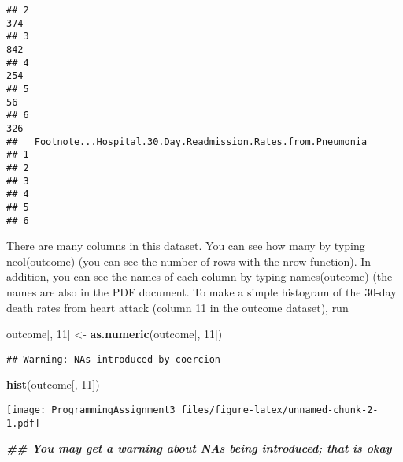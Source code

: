 \documentclass[
]{article}
\newenvironment{Shaded}{\begin{snugshade}}{\end{snugshade}}
\newcommand{\DecValTok}[1]{\textcolor[rgb]{0.00,0.00,0.81}{#1}}
\newcommand{\DocumentationTok}[1]{\textcolor[rgb]{0.56,0.35,0.01}{\textbf{\textit{#1}}}}
\newcommand{\FunctionTok}[1]{\textcolor[rgb]{0.13,0.29,0.53}{\textbf{#1}}}
\newcommand{\NormalTok}[1]{#1}
\newcommand{\OtherTok}[1]{\textcolor[rgb]{0.56,0.35,0.01}{#1}}
\begin{document}
\begin{verbatim}
## 2                                                                   374
## 3                                                                   842
## 4                                                                   254
## 5                                                                    56
## 6                                                                   326
##   Footnote...Hospital.30.Day.Readmission.Rates.from.Pneumonia
## 1                                                            
## 2                                                            
## 3                                                            
## 4                                                            
## 5                                                            
## 6
\end{verbatim}

There are many columns in this dataset. You can see how many by typing
ncol(outcome) (you can see the number of rows with the nrow function).
In addition, you can see the names of each column by typing
names(outcome) (the names are also in the PDF document. To make a simple
histogram of the 30-day death rates from heart attack (column 11 in the
outcome dataset), run

\begin{Shaded}
\begin{Highlighting}[]
\NormalTok{outcome[, }\DecValTok{11}\NormalTok{] }\OtherTok{\textless{}{-}} \FunctionTok{as.numeric}\NormalTok{(outcome[, }\DecValTok{11}\NormalTok{])}
\end{Highlighting}
\end{Shaded}

\begin{verbatim}
## Warning: NAs introduced by coercion
\end{verbatim}

\begin{Shaded}
\begin{Highlighting}[]
\FunctionTok{hist}\NormalTok{(outcome[, }\DecValTok{11}\NormalTok{])}
\end{Highlighting}
\end{Shaded}

\texttt{[image: ProgrammingAssignment3\_files/figure-latex/unnamed-chunk-2-1.pdf]}

\begin{Shaded}
\begin{Highlighting}[]
\DocumentationTok{\#\# You may get a warning about NAs being introduced; that is okay}
\end{Highlighting}
\end{Shaded}
\end{document}
